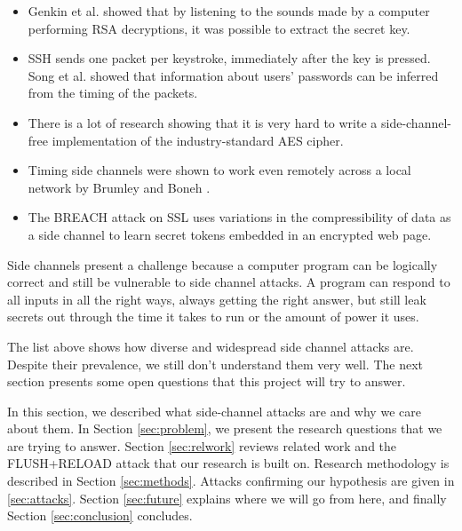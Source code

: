 \documentclass{acm_proc_article-sp}
\begin{document}
\begin{itemize}
\item Genkin et al. \cite{genkin2013rsa} showed that by listening to the sounds
made by a computer performing RSA decryptions, it was possible to extract the
secret key.

\item SSH sends one packet per keystroke, immediately after the key is pressed.
Song et al. \cite{song2001timing} showed that information about users' passwords
can be inferred from the timing of the packets.

\item There is a lot of research \cite{aciiccmez2006cache, bernstein2005cache,
    osvik2006cache, weiss2012cache} showing that it is very hard to write
    a side-channel-free implementation of the industry-standard AES cipher.

\item Timing side channels were shown to work even remotely across a local
network by Brumley and Boneh \cite{brumley2005remote}.

\item The BREACH attack on SSL \cite{gluck2013breach} uses variations in the
    compressibility of data as a side channel to learn secret tokens embedded in
    an encrypted web page.
\end{itemize}

Side channels present a challenge because a computer program can be logically
correct and still be vulnerable to side channel attacks. A program can respond
to all inputs in all the right ways, always getting the right answer, but still
leak secrets out through the time it takes to run or the amount of power it
uses.

The list above shows how diverse and widespread side channel attacks are.
Despite their prevalence, we still don't understand them very well. The next
section presents some open questions that this project will try to answer.

In this section, we described what side-channel attacks are and why we care
about them. In Section \ref{sec:problem}, we present the research questions that we are
trying to answer. Section \ref{sec:relwork} reviews related work and the
FLUSH+RELOAD attack that our research is built on. Research methodology is
described in Section \ref{sec:methods}. Attacks confirming our hypothesis are
given in \ref{sec:attacks}. Section \ref{sec:future} explains where we
will go from here, and finally Section \ref{sec:conclusion} concludes.
\end{document}
